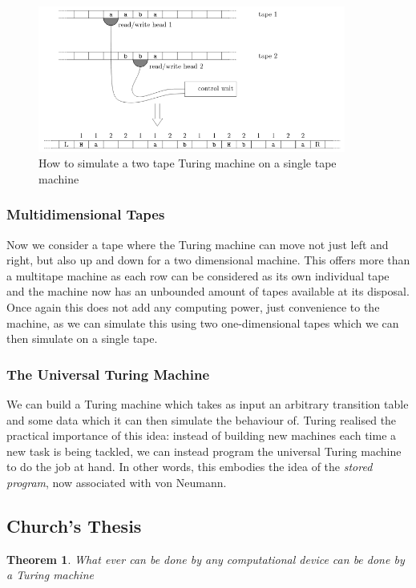 \documentclass[11pt]{article}
\newtheorem{theorem}{Theorem}
\begin{document}
	\begin{figure}[ht]
		\centering
		\includegraphics[width=0.9\textwidth]{two_tape_turing_machine}
		\caption{How to simulate a two tape Turing machine on a single tape machine}
		\label{fig:two tape turing machine}
	\end{figure}
	
	\subsubsection{Multidimensional Tapes}
	Now we consider a tape where the Turing machine can move not just left and right, but also up and down for a two dimensional machine. This offers more than a multitape machine as each row can be considered as its own individual tape and the machine now has an unbounded amount of tapes available at its disposal. Once again this does not add any computing power, just convenience to the machine, as we can simulate this using two one-dimensional tapes which we can then simulate on a single tape.
	
	
	\subsubsection{The Universal Turing Machine}
	We can build a Turing machine which takes as input an arbitrary transition table and some data which it can then simulate the behaviour of. Turing realised the practical importance of this idea: instead of building new machines each time a new task is being tackled, we can instead program the universal Turing machine to do the job at hand. In other words, this embodies the idea of the \textit{stored program}, now associated with von Neumann. 
	
	\subsection{Church's Thesis}
	\begin{theorem} 
		What ever can be done by any computational device can be done by a Turing machine
	\end{theorem}
	
\end{document}
